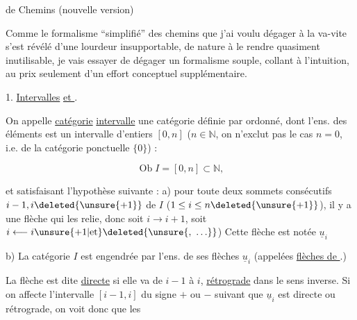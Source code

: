 
 de Chemins (nouvelle version)

Comme le formalisme ``simplifié'' des chemins que j'ai voulu dégager à la va-vite s'est révélé d'une lourdeur insupportable, de nature à le rendre quasiment inutilisable, je vais essayer de dégager un formalisme souple, collant à l'intuition, au prix seulement d'un effort conceptuel supplémentaire.

1. \uline{Intervalles} \uline{et  }.

On appelle \uline{catégorie} \uline{intervalle} \uline{} une catégorie définie par   ordonné, dont l'ens. des éléments est un intervalle d'entiers $[0,n]$ ($n\in\mathbb{N}$, on n'exclut pas le cas $n=0$, i.e. de la catégorie ponctuelle $\{0\}$) :

\[\operatorname{Ob}I=[0,n]\subset\mathbb{N},\]

 et satisfaisant l'hypothèse suivante : a) pour toute    deux sommets consécutifs $i-1,i\deleted{\unsure{+1}}$ de $I$ ($1\leq i\leq n\deleted{\unsure{+1}}$), il y a une flèche qui les relie, donc soit $i\longrightarrow i+1$, soit $i\longleftarrow i\unsure{+1|\text{et}}\deleted{\unsure{,\ \ldots}}$) Cette flèche est notée $\underline{u}_i$


b) La catégorie $I$ est engendrée par l'ens. de ses flèches $\underline{u}_i$ (appelées \uline{flèches de }.)

 La flèche   est dite \uline{directe} si elle va de $i-1$ à $i$, \uline{rétrograde} dans le sens inverse. Si on affecte l'intervalle $[i-1,i]$ du signe $+$ ou $-$ suivant que $\underline{u}_i$ est directe ou rétrograde, on voit donc que les

